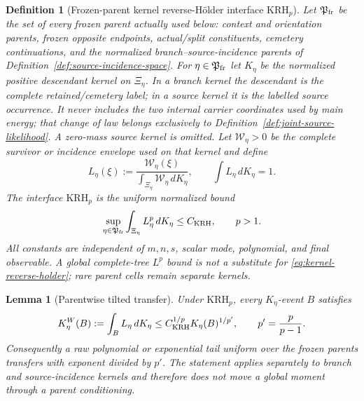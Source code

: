 \documentclass[11pt]{article}
\newtheorem{lemma}[theorem]{Lemma}
\newtheorem{definition}[theorem]{Definition}
\begin{document}
\begin{definition}[Frozen-parent kernel reverse-H\"older interface
$\mathrm{KRH}_{p}$]
\label{def:kernel-reverse-holder}
Let $\mathfrak P_{\rm fr}$ be the set of every frozen parent actually used
below: context and orientation parents, frozen opposite endpoints,
actual/split constituents, cemetery continuations, and the normalized
branch--source-incidence parents of
Definition~\ref{def:source-incidence-space}.  For
$\eta\in\mathfrak P_{\rm fr}$ let $K_\eta$ be the normalized positive
descendant kernel on $\Xi_\eta$.  In a branch kernel the descendant is the
complete retained/cemetery label; in a source kernel it is the labelled
source occurrence.  It never includes the two internal carrier coordinates
used by main energy; that change of law belongs exclusively to
Definition~\ref{def:joint-source-likelihood}.  A zero-mass source kernel is omitted.  Let
$\mathscr W_\eta>0$ be the complete survivor or incidence envelope used on
that kernel and define
\begin{equation}
\label{eq:kernel-normalized-likelihood}
 L_\eta(\xi):=
 \frac{\mathscr W_\eta(\xi)}
      {\int_{\Xi_\eta}\mathscr W_\eta\,dK_\eta},
 \qquad \int L_\eta\,dK_\eta=1.
\end{equation}
The interface $\mathrm{KRH}_{p}$ is the uniform normalized bound
\begin{equation}
\label{eq:kernel-reverse-holder}
 \sup_{\eta\in\mathfrak P_{\rm fr}}
 \int_{\Xi_\eta}L_\eta^p\,dK_\eta\le C_{\rm KRH},
 \qquad p>1.
\end{equation}
All constants are independent of $m,n,s$, scalar mode, polynomial, and final
observable.  A global complete-tree $L^p$ bound is not a substitute for
\eqref{eq:kernel-reverse-holder}; rare parent cells remain separate kernels.
\end{definition}

\begin{lemma}[Parentwise tilted transfer]
\label{lem:parentwise-holder-transfer}
Under $\mathrm{KRH}_{p}$, every $K_\eta$-event $B$ satisfies
\begin{equation}
\label{eq:parentwise-holder-transfer}
 K_\eta^{W}(B):=\int_B L_\eta\,dK_\eta
 \le C_{\rm KRH}^{1/p}K_\eta(B)^{1/p'},
 \qquad p'=\frac p{p-1}.
\end{equation}
Consequently a raw polynomial or exponential tail uniform over the frozen
parents transfers with exponent divided by $p'$.  The statement applies
separately to branch and source-incidence kernels and therefore does not move
a global moment through a parent conditioning.
\end{lemma}
\end{document}

